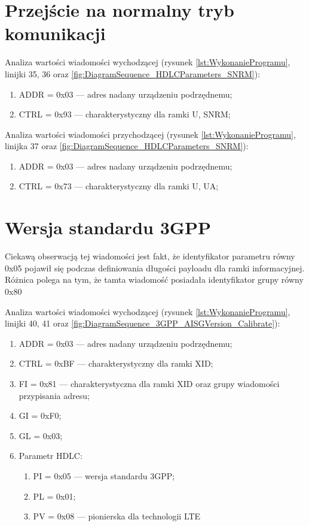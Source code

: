 \section{Przejście na normalny tryb komunikacji}
Analiza wartości wiadomości wychodzącej 
(rysunek \ref{lst:WykonanieProgramu}, linijki 35, 36 oraz \ref{fig:DiagramSequence_HDLCParameters_SNRM}):
\begin{enumerate}
    \item ADDR = 0x03 --- adres nadany urządzeniu podrzędnemu;
    \item CTRL = 0x93 --- charakterystyczny dla ramki U, SNRM;
\end{enumerate}

Analiza wartości wiadomości przychodzącej
(rysunek \ref{lst:WykonanieProgramu}, linijka 37 oraz \ref{fig:DiagramSequence_HDLCParameters_SNRM}):
\begin{enumerate}
    \item ADDR = 0x03 --- adres nadany urządzeniu podrzędnemu;
    \item CTRL = 0x73 --- charakterystyczny dla ramki U, UA;
\end{enumerate}

\section{Wersja standardu 3GPP}
Ciekawą obserwacją tej wiadomości jest fakt, że identyfikator parametru równy 0x05 pojawił się podczas definiowania długości payloadu
dla ramki informacyjnej. Różnica polega na tym, że tamta wiadomość posiadała identyfikator grupy równy 0x80

Analiza wartości wiadomości wychodzącej 
(rysunek \ref{lst:WykonanieProgramu}, linijki {40, 41} oraz \ref{fig:DiagramSequence_3GPP_AISGVersion_Calibrate}):
\begin{enumerate}
    \item ADDR = 0x03 --- adres nadany urządzeniu podrzędnemu;
    \item CTRL = 0xBF --- charakterystyczny dla ramki XID;
    \item FI = 0x81 --- charakterystyczna dla ramki XID oraz grupy wiadomości przypisania adresu;
    \item GI = 0xF0;
    \item GL = 0x03;
    \item Parametr HDLC:
    \begin{enumerate}
        \item PI = 0x05 --- wersja standardu 3GPP;
        \item PL = 0x01;
        \item PV = 0x08 --- pionierska dla technologii LTE
    \end{enumerate}
\end{enumerate}

